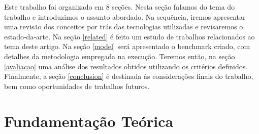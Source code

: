 \documentclass[twoside,english,brazilian]{UNISINOSartigo}
\begin{document}
Este trabalho foi organizado em 8 seções. Nesta seção falamos do tema do trabalho e introduzimos o assunto abordado. Na sequência, iremos apresentar uma revisão dos conceitos por trás das tecnologias utilizadas e revisaremos o estado-da-arte. Na seção \ref{related} é feito um estudo de trabalhos relacionados ao tema deste artigo. Na seção \ref{model} será apresentado o benchmark criado, com detalhes da metodologia empregada na execução. Teremos então, na seção \ref{avaliacao} uma análise dos resultados obtidos utilizando os critérios definidos. Finalmente, a seção \ref{conclusion} é destinada às considerações finais do trabalho, bem como oportunidades de trabalhos futuros.

\section{Fundamentação Teórica}
\label{fundamentacao}
\end{document}
